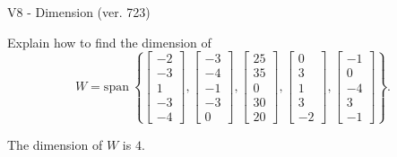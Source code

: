 \begin{exercise}
  \begin{exerciseTitle}V8 - Dimension (ver. 723)\end{exerciseTitle}
  \begin{exerciseStatement}
    Explain how to find the dimension of 
\[W=\mathrm{span}\ \left\{\left[\begin{array}{r}
-2 \\
-3 \\
1 \\
-3 \\
-4
\end{array}\right] , \left[\begin{array}{r}
-3 \\
-4 \\
-1 \\
-3 \\
0
\end{array}\right] , \left[\begin{array}{r}
25 \\
35 \\
0 \\
30 \\
20
\end{array}\right] , \left[\begin{array}{r}
0 \\
3 \\
1 \\
3 \\
-2
\end{array}\right] , \left[\begin{array}{r}
-1 \\
0 \\
-4 \\
3 \\
-1
\end{array}\right]\right\}.\]



  \end{exerciseStatement}
  \begin{exerciseAnswer}
   The dimension of \(W\) is  \(4\).
  


  \end{exerciseAnswer}
\end{exercise}